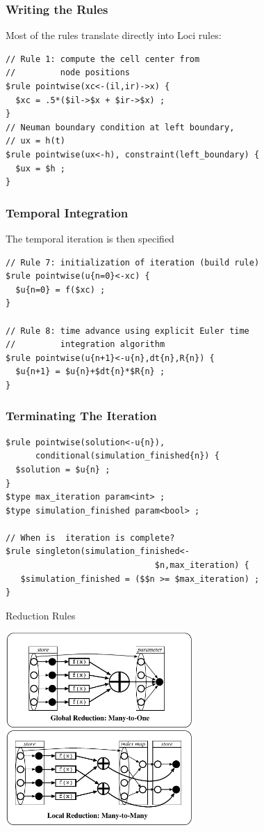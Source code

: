 \documentclass{beamer}
\begin{document}
\begin{frame}[fragile=singleslide]\frametitle{Writing the Rules}
Most of the rules translate directly into Loci rules:
\begin{verbatim}
// Rule 1: compute the cell center from 
//         node positions
$rule pointwise(xc<-(il,ir)->x) {
  $xc = .5*($il->$x + $ir->$x) ;
}
// Neuman boundary condition at left boundary, 
// ux = h(t)
$rule pointwise(ux<-h), constraint(left_boundary) {
  $ux = $h ;
}
\end{verbatim}
\end{frame}
\begin{frame}[fragile=singleslide]\frametitle{Temporal Integration}
The temporal iteration is then specified
\begin{verbatim}
// Rule 7: initialization of iteration (build rule)
$rule pointwise(u{n=0}<-xc) {
  $u{n=0} = f($xc) ;
}

// Rule 8: time advance using explicit Euler time 
//         integration algorithm
$rule pointwise(u{n+1}<-u{n},dt{n},R{n}) {
  $u{n+1} = $u{n}+$dt{n}*$R{n} ;
}
\end{verbatim}
\end{frame}
\begin{frame}[fragile=singleslide]\frametitle{Terminating The Iteration}
\begin{verbatim}
$rule pointwise(solution<-u{n}),
      conditional(simulation_finished{n}) {
  $solution = $u{n} ;
}
$type max_iteration param<int> ;
$type simulation_finished param<bool> ;

// When is  iteration is complete?
$rule singleton(simulation_finished<-
                              $n,max_iteration) {
   $simulation_finished = ($$n >= $max_iteration) ;
}
\end{verbatim}
\end{frame}

\begin{frame}{Reduction Rules}
\begin{center}
\includegraphics[height=2.9in]{Figures/reduction}
\end{center}
\end{frame}
\end{document}
